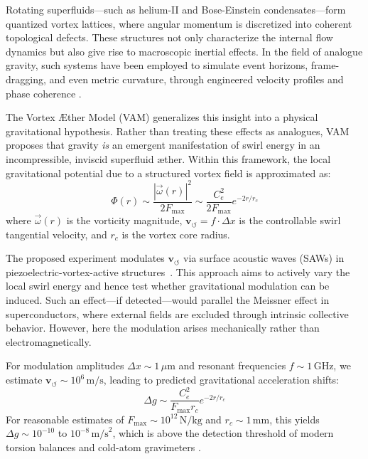 \documentclass[preprint]{revtex4-2}
\begin{document}
    Rotating superfluids—such as helium-II and Bose-Einstein condensates—form quantized vortex lattices, where angular momentum is discretized into coherent topological defects. These structures not only characterize the internal flow dynamics but also give rise to macroscopic inertial effects. In the field of analogue gravity, such systems have been employed to simulate event horizons, frame-dragging, and even metric curvature, through engineered velocity profiles and phase coherence \cite{barcelo2005analogue, volovik2003universe}.

    The Vortex \AE{}ther Model (VAM) generalizes this insight into a physical gravitational hypothesis. Rather than treating these effects as analogues, VAM proposes that gravity \emph{is} an emergent manifestation of swirl energy in an incompressible, inviscid superfluid \ae ther. Within this framework, the local gravitational potential due to a structured vortex field is approximated as:
    \[
        \Phi(r) \sim \frac{|\vec{\omega}(r)|^2}{2 F_{\text{max}}} \sim \frac{C_e^2}{2 F_{\text{max}}} e^{-2r/r_c}
    \]
    where \( \vec{\omega}(r) \) is the vorticity magnitude, \( \mathbf{v}_{\scriptscriptstyle\boldsymbol{\circlearrowleft}} = f \cdot \Delta x \) is the controllable swirl tangential velocity, and \( r_c \) is the vortex core radius.

    The proposed experiment modulates \( \mathbf{v}_{\scriptscriptstyle\boldsymbol{\circlearrowleft}} \) via surface acoustic waves (SAWs) in piezoelectric-vortex-active structures~\cite{iskandarani2025experimentalCe}. This approach aims to actively vary the local swirl energy and hence test whether gravitational modulation can be induced. Such an effect—if detected—would parallel the Meissner effect in superconductors, where external fields are excluded through intrinsic collective behavior. However, here the modulation arises mechanically rather than electromagnetically.

    For modulation amplitudes \( \Delta x \sim 1 \, \mu\text{m} \) and resonant frequencies \( f \sim 1\, \text{GHz} \), we estimate \( \mathbf{v}_{\scriptscriptstyle\boldsymbol{\circlearrowleft}} \sim 10^6 \, \text{m/s} \), leading to predicted gravitational acceleration shifts:
    \[
        \Delta g \sim \frac{C_e^2}{F_{\text{max}} r_c} e^{-2r/r_c}
    \]
    For reasonable estimates of \( F_{\text{max}} \sim 10^{12} \, \text{N/kg} \) and \( r_c \sim 1 \, \text{mm} \), this yields \( \Delta g \sim 10^{-10} \) to \( 10^{-8} \, \text{m/s}^2 \), which is above the detection threshold of modern torsion balances and cold-atom gravimeters \cite{packard1998superfluid, zmeev2018masssensor}.
\end{document}
